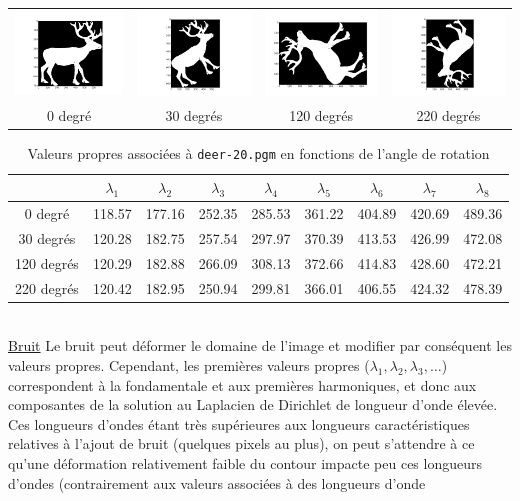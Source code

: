 \documentclass[a4paper,10pt]{article} %
\theoremstyle{definition} %
\begin{document}
\begin{center}
  \begin{tabular}{c c c c}
    \includegraphics[scale=0.15]{rotate/0.png} & \includegraphics[scale=0.15]{rotate/30.png} & \includegraphics[scale=0.15]{rotate/120.png} & \includegraphics[scale=0.15]{rotate/220.png} \\
    0 degré & 30 degrés & 120 degrés & 220 degrés
  \end{tabular}
\end{center}

\begin{table}[H]
  \begin{center}
    \begin{tabular}{c | c c c c c c c c}
                & $\lambda_1$ & $\lambda_2$ & $\lambda_3$ & $\lambda_4$ & $\lambda_5$ & $\lambda_6$ & $\lambda_7$ & $\lambda_8$ \\ \hline
      0 degré    & 118.57 & 177.16 & 252.35 & 285.53 & 361.22 & 404.89 & 420.69 & 489.36 \\
      30 degrés  & 120.28 & 182.75 & 257.54 & 297.97 & 370.39 & 413.53 & 426.99 & 472.08 \\
      120 degrés & 120.29 & 182.88 & 266.09 & 308.13 & 372.66 & 414.83 & 428.60 & 472.21 \\
      220 degrés & 120.42 & 182.95 & 250.94 & 299.81 & 366.01 & 406.55 & 424.32 & 478.39 
    \end{tabular}
  \end{center}
  \caption{Valeurs propres associées à \texttt{deer-20.pgm} en fonctions de l'angle de rotation}
  \label{rot}
\end{table}

~\\
\underline{Bruit} Le bruit peut déformer le domaine de l'image et modifier par conséquent les valeurs propres. Cependant, les premières valeurs propres ($\lambda_1, \lambda_2, \lambda_3, \dots$) correspondent à la fondamentale et aux premières harmoniques, et donc aux composantes de la solution au Laplacien de Dirichlet de longueur d'onde élevée. Ces longueurs d'ondes étant très supérieures aux longueurs caractéristiques relatives à l'ajout de bruit (quelques pixels au plus), on peut s'attendre à ce qu'une déformation relativement faible du contour impacte peu ces longueurs d'ondes (contrairement aux valeurs associées à des longueurs d'onde
\end{document}

